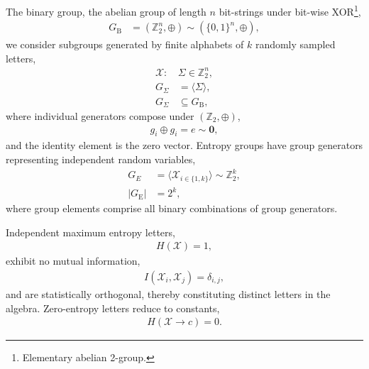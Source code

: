 \documentclass[twocolumn, aps, amsmath, amssymb, nofootinbib, superscriptaddress, longbibliography, doublefloatfix, table-of-contents, eqsecnum, rmp]{revtex4-2}
\def\zerovec{\mathbf{0}}
\begin{document}
The binary group, the abelian group of length $n$ bit-strings under bit-wise XOR\footnote{Elementary abelian 2-group.},
\begin{align}
	G_\mathrm{B} &= (\mathbb{Z}_2^n,\oplus) \sim  (\{0,1\}^n,\oplus),
\end{align}
we consider subgroups generated by finite alphabets of $k$ randomly sampled letters,
\begin{align}
	\mathcal{X}:\, &\Sigma \in \mathbb{Z}_2^n,\nonumber\\ %
	G_\Sigma &= \langle \Sigma \rangle, \nonumber\\
	G_\Sigma &\subseteq G_\mathrm{B},
\end{align}
where individual generators compose under $(\mathbb{Z}_2,\oplus)$,
\begin{align}
	g_i\oplus g_i = e \sim \zerovec,
\end{align}
and the identity element is the zero vector. Entropy groups have group generators representing independent random variables,
\begin{align}
	G_E &= \langle \mathcal{X}_{i\in\{1,k\}} \rangle \sim \mathbb{Z}_2^k,\nonumber\\
	|G_\mathrm{E}| &= 2^k,
\end{align}
where group elements comprise all binary combinations of group generators.

Independent maximum entropy letters,
\begin{align}
	H(\mathcal{X}) = 1,
\end{align}
exhibit no mutual information,
\begin{align}
	I(\mathcal{X}_i,\mathcal{X}_j) = \delta_{i,j},
\end{align}
and are statistically orthogonal, thereby constituting distinct letters in the algebra. Zero-entropy letters reduce to constants,
\begin{align}
	H(\mathcal{X} \to c) = 0.
\end{align}
\end{document}
